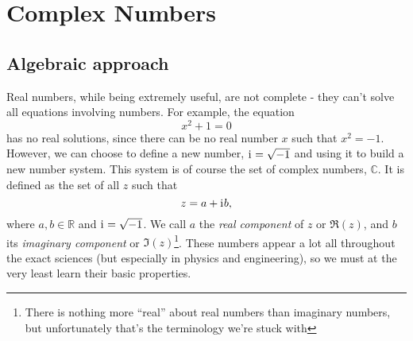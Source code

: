 
\newcommand{\arcc}[3]{
	\draw[#3, fill=#3!20] (0,0) -- (#2,0) arc (0:#1:#2) -- cycle;
}

\newcommand{\cmplxsol}[1]{
	\coordinate (O) at (0,0);
	\draw[black!20] (1,0) arc (0:360:1);
	\pgfmathsetmacro{\dt}{360/#1}
	\pgfmathsetmacro{\n}{int(#1-1)}
	\pgfplotsinvokeforeach{\n,...,0}{
		\pgfmathparse{##1+1}
		\draw[xcol##1, fill=xcol##1!20] (O) -- ({0.1*##1},0) arc (0:{\dt*##1}:{0.1*##1}) -- cycle;
		\draw[very thick, xcol##1] (O) -- ({cos(\dt*##1)},{sin(\dt*##1)}) node[complex]{};
		\node[xcol##1, fill=xcol##1!10, rounded corners]  at ({1.23*cos(\dt*##1)},{1.23*sin(\dt*##1)}) {$z_{\the\numexpr##1+1\relax}$};
	}
}

\section{Complex Numbers}\label{sec:complex numbers}
\subsection{Algebraic approach}
Real numbers, while being extremely useful, are not complete - they can't solve all equations involving numbers. For example, the equation
\begin{equation}
	x^{2} + 1 = 0
	\label{eq:no_real_solutions}
\end{equation}
has no real solutions, since there can be no real number $x$ such that $x^{2}=-1$. However, we can choose to define a new number, $\mathrm{i}\mkern1mu=\sqrt{-1}$ and using it to build a new number system. This system is of course the set of complex numbers, $\mathbb{C}$. It is defined as the set of all $z$ such that
\begin{equation}
	z = a+\mathrm{i}\mkern1mu b,
	\label{eq:complex_number}
\end{equation}
where $a,b\in\mathbb{R}$ and $\mathrm{i}\mkern1mu=\sqrt{-1}$. We call $a$ the \emph{real component} of $z$ or $\Re(z)$, and $b$ its \emph{imaginary component} or $\Im(z)$\footnote{There is nothing more ``real'' about real numbers than imaginary numbers, but unfortunately that's the terminology we're stuck with \shrug}. These numbers appear a lot all throughout the exact sciences (but especially in physics and engineering), so we must at the very least learn their basic properties.

